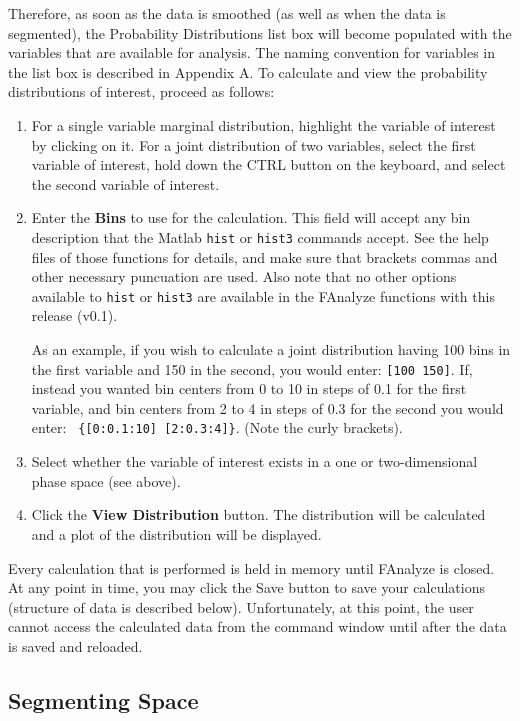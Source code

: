 \documentclass[letterpaper, 11pt]{article}
\begin{document}
Therefore, as soon as the data is smoothed (as well as when the data is segmented), the Probability
Distributions list box will become populated with the variables that are available for analysis.
The naming convention for variables in the list box is described in Appendix A. To calculate and
view the probability distributions of interest, proceed as follows:
\begin{enumerate}
\item For a single variable marginal distribution, highlight the variable of interest by clicking
on it.  For a joint distribution of two variables, select the first variable of interest, hold down
the CTRL button on the keyboard, and select the second variable of interest.
\item Enter the \textbf{Bins} to use for the calculation. This field will accept any bin description that the Matlab \texttt{hist} or \texttt{hist3} commands accept.  See
the help files of those functions for details, and make sure that brackets commas and other
necessary puncuation are used. Also note that no other options available to \texttt{hist} or
\texttt{hist3} are available in the FAnalyze functions with this release (v0.1).

As an example, if you wish to calculate a joint distribution having 100 bins in the first variable
and 150 in the second, you would enter: \texttt{[100 150]}.  If, instead you wanted bin centers
from 0 to 10 in steps of 0.1 for the first variable, and bin centers from 2 to 4 in steps of 0.3
for the second you would enter: \texttt{ \{[0:0.1:10] [2:0.3:4]\}}. (Note the curly brackets).

\item  Select whether the variable of interest exists in a one or two-dimensional phase space (see above).

\item Click the \textbf{View Distribution} button.  The distribution will be calculated and a plot
of the distribution will be displayed.
\end{enumerate}
Every calculation that is performed is held in memory until FAnalyze is closed.  At any point in
time, you may click the Save button to save your calculations (structure of data is described
below).  Unfortunately, at this point, the user cannot access the calculated data from the command
window until after the data is saved and reloaded.

\subsection*{Segmenting Space}
\end{document}
